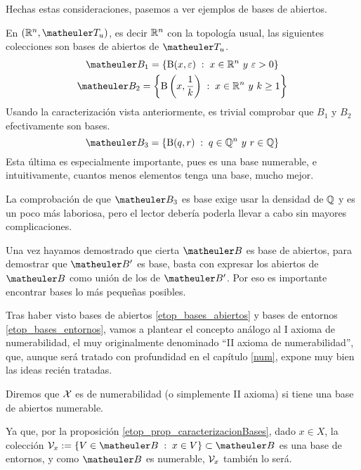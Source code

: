 Hechas estas consideraciones, pasemos a ver ejemplos de bases de abiertos.
\begin{exa}
	\label{etop_bases}
	En $( \R^n,\T_u )$, es decir $\mathbb{R}^n$ con la topología usual, las siguientes colecciones son bases de abiertos de $\T_u$.
 	 \begin{gather}
 	 	\B_1=\{\bola(x, \varepsilon) \midc x \in \R^n\ y \ \varepsilon > 0\}\\
 	 	\B_2=\left\{\bola\left(x, \frac{1}{k}\right) \midc x \in \R^n\ y \ k \geq 1\right\}
 	 \end{gather}
	 Usando la caracterización vista anteriormente, es trivial comprobar que $B_1$ y $B_2$ efectivamente son bases.
	 \begin{equation}
	 	\B_3=\{\bola(q, r) \midc q \in \Q^n\ y \ r \in \Q\}
	 \end{equation}
	 Esta última es especialmente importante, pues es una base numerable, e intuitivamente, cuantos menos elementos tenga una base, mucho mejor.
	 
	 La comprobación de que $\B_3$ es base exige usar la densidad de $\mathbb{Q}$ y es un poco más laboriosa, pero el lector debería poderla llevar a cabo sin mayores complicaciones.
\end{exa}
\begin{obs}
	Una vez hayamos demostrado que cierta $\B$ es base de abiertos, para demostrar que $\B'$ es base, basta con expresar los abiertos de $\B$ como unión de los de $\B'$. Por eso es importante encontrar bases lo más pequeñas posibles.  \qedhere
\end{obs}

Tras haber visto bases de abiertos \ref{etop_bases_abiertos} y bases de entornos \ref{etop_bases_entornos}, vamos a plantear el concepto análogo al I axioma de numerabilidad, el muy originalmente denominado ``II axioma de numerabilidad'', que, aunque será tratado con profundidad en el capítulo \ref{num}, expone muy bien las ideas recién tratadas.
 
\begin{defi}
	\label{etop_2_axioma_num}
	Diremos que $\mathcal{X}$ es  de numerabilidad (o simplemente II axioma) si tiene una base de abiertos numerable.

\end{defi}
\begin{obs}
	\label{etop_2_axioma_sep}
	Ya que, por la proposición \ref{etop_prop_caracterizacionBases}, dado $x\in X$, la colección $\V_x:=\{V\in\B\midc x\in V\}\subset\B$ es una base de entornos, y como $\B$ es numerable, $\mathcal{V}_x$ también lo será.
\end{obs}


